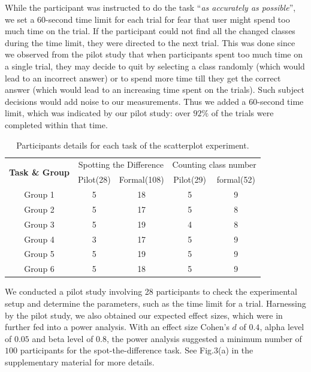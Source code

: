 While the participant was instructed to do the task ``\emph{as accurately as possible}'', we set a $60$-second time limit for each trial for fear that user might spend too much time on the trial. If the participant could not find all the changed classes during the time limit, they were directed to the next trial. %
This was done since we observed from the pilot study that when participants spent too much time on a single trial, they may decide to quit by selecting a class randomly (which would lead to an incorrect answer) or to spend more time till they get the correct answer
(which would lead to an increasing time spent on the trials). Such subject decisions would add noise to our measurements. Thus we added a $60$-second time limit, which was indicated by our pilot study: over $92\%$ of the trials were completed within that time.

\begin{table}[ht]
\renewcommand\arraystretch{1}
\centering
\caption{Participants details for each task of the scatterplot experiment.}
\label{tab:participantDetail}
\begin{tabular}{|c|c|c|c|c|}
\hline
\multirow{2}{*}{\textbf{Task \& Group}} & \multicolumn{2}{c|}{Spotting the Difference} & \multicolumn{2}{c|}{Counting class number} \\
\cline{2-5}
& Pilot(28) & Formal(108) & Pilot(29) & formal(52) \\
\hline
Group 1 & 5 & 18 & 5  & 9 \\
\hline
Group 2 & 5 & 17 & 5  & 8 \\
\hline
Group 3 & 5 & 19 & 4  & 8 \\
\hline
Group 4 & 3 & 17 & 5  & 9 \\
\hline
Group 5 & 5 & 19 & 5  & 9 \\
\hline
Group 6 & 5 & 18 & 5  & 9 \\
\hline
\end{tabular}
\end{table}


\vspace{.3em}
We conducted a pilot study involving 28 participants to check the experimental setup and determine the parameters, such as the time limit for a trial.
Harnessing by the pilot study, we also obtained our expected effect sizes, which were in further fed into a power analysis. With an effect size Cohen's $d$ of $0.4$, alpha level of $0.05$ and beta level of $0.8$, the power analysis suggested a minimum number of $100$ participants for the spot-the-difference task. See Fig.3(a) in the supplementary material for more details.


